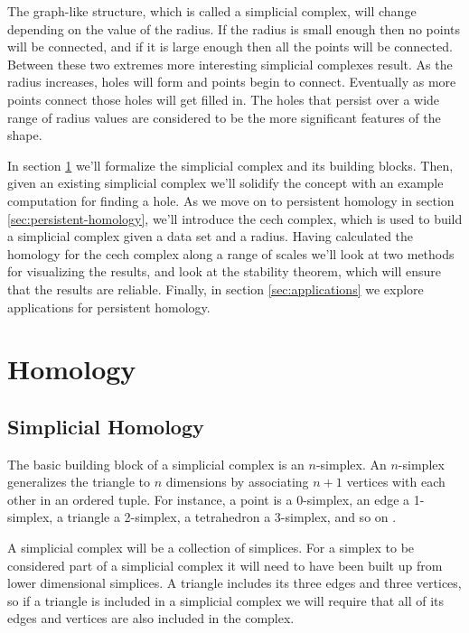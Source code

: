 The graph-like structure, which is called a simplicial complex, will change depending on the value of the radius.
If the radius is small enough then no points will be connected, and if it is large enough then all the points will be connected.
Between these two extremes more interesting simplicial complexes result.
As the radius increases, holes will form and points begin to connect.
Eventually as more points connect those holes will get filled in.
The holes that persist over a wide range of radius values are considered to be the more significant features of the shape.

In section \ref{sec:homology} we'll formalize the simplicial complex and its building blocks.
Then, given an existing simplicial complex we'll solidify the concept with an example computation for finding a hole.
As we move on to persistent homology in section \ref{sec:persistent-homology}, we'll introduce the cech complex, which is used to build a simplicial complex given a data set and a radius.
Having calculated the homology for the cech complex along a range of scales we'll look at two methods for visualizing the results, and  look at the stability theorem, which will ensure that the results are reliable.
Finally, in section \ref{sec:applications} we  explore applications for persistent homology.

\section{Homology}\label{sec:homology}

\subsection{Simplicial Homology}\label{sec:simplicial-homology}

The basic building block of a simplicial complex is an \(n\)-simplex. %
An \(n\)-simplex generalizes the triangle to \(n\) dimensions by associating \(n+1\) vertices with each other in an ordered tuple.
For instance, a point is a 0-simplex, an edge a 1-simplex, a triangle a 2-simplex, a tetrahedron a 3-simplex, and so on .

\begin{figure}
    
    \caption{}
    \label{fig:basic-simplices}
\end{figure}

A simplicial complex will be a collection of simplices.
For a simplex to be considered part of a simplicial complex it will need to have been built up from lower dimensional simplices.
A triangle includes its three edges and three vertices, so if a triangle is included in a simplicial complex we will require that all of its edges and vertices are also included in the complex.

